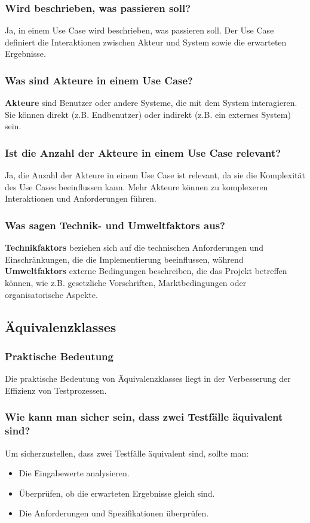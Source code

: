 \documentclass[main.tex]{subfiles}
\begin{document}
\subsubsection*{Wird beschrieben, was passieren soll?}
Ja, in einem \gls{Use Case} wird beschrieben, was passieren soll. Der \gls{Use Case} definiert die Interaktionen zwischen Akteur und System sowie die erwarteten Ergebnisse.


\subsubsection*{Was sind Akteure in einem \gls{Use Case}?}
\textbf{Akteure} sind Benutzer oder andere Systeme, die mit dem System interagieren. Sie können direkt (z.B. Endbenutzer) oder indirekt (z.B. ein externes System) sein.

\subsubsection*{Ist die Anzahl der Akteure in einem \gls{Use Case} relevant?}
Ja, die Anzahl der Akteure in einem \gls{Use Case} ist relevant, da sie die Komplexität des \glspl{Use Case} beeinflussen kann. Mehr Akteure können zu komplexeren Interaktionen und Anforderungen führen.


\subsubsection*{Was sagen Technik- und \glspl{Umweltfaktor} aus?}
\textbf{\glspl{Technikfaktor}} beziehen sich auf die technischen Anforderungen und Einschränkungen, die die Implementierung beeinflussen, während \textbf{\glspl{Umweltfaktor}} externe Bedingungen beschreiben, die das Projekt betreffen können, wie z.B. gesetzliche Vorschriften, Marktbedingungen oder organisatorische Aspekte.


\subsection{\glspl{Äquivalenzklasse}}
\subsubsection*{Praktische Bedeutung}
Die praktische Bedeutung von \glspl{Äquivalenzklasse} liegt in der Verbesserung der Effizienz von Testprozessen.


\subsubsection*{Wie kann man sicher sein, dass zwei Testfälle äquivalent sind?}
Um sicherzustellen, dass zwei Testfälle äquivalent sind, sollte man:
\begin{itemize}
    \item Die Eingabewerte analysieren.
    \item Überprüfen, ob die erwarteten Ergebnisse gleich sind.
    \item Die Anforderungen und Spezifikationen überprüfen.
\end{itemize}
\end{document}
